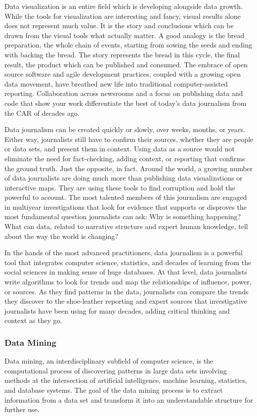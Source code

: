 Data visualization is an entire field which is developing alongside data growth. While the tools for visualization are interesting and fancy, visual results alone does not represent much value. It is the story and conclusions which can be drawn from the visual tools what actually matter. A good analogy is the bread preparation, the whole chain of events, starting from sowing the seeds and ending with backing the bread. The story represents the bread in this cycle, the final result, the product which can be published and consumed. The embrace of open source software and agile development practices, coupled with a growing open data movement, have breathed new life into traditional computer-assisted reporting. Collaboration across newsrooms and a focus on publishing data and code that show your work differentiate the best of today’s data journalism from the CAR of decades ago.

Data journalism can be created quickly or slowly, over weeks, months, or years. Either way, journalists still have to confirm their sources, whether they are people or data sets, and present them in context. Using data as a source would not eliminate the need for fact-checking, adding context, or reporting that confirms the ground truth. Just the opposite, in fact. Around the world, a growing number of data journalists are doing much more than publishing data visualizations or interactive maps. They are using these tools to find corruption and hold the powerful to account. The most talented members of this journalism are engaged in multiyear investigations that look for evidence that supports or disproves the most fundamental question journalists can ask: Why is something happening? What can data, related to narrative structure and expert human knowledge, tell about the way the world is changing?

In the hands of the most advanced practitioners, data journalism is a powerful tool that integrates computer science, statistics, and decades of learning from the social sciences in making sense of huge databases. At that level, data journalists write algorithms to look for trends and map the relationships of influence, power, or sources. As they find patterns in the data, journalists can compare the trends they discover to the shoe-leather reporting and expert sources that investigative journalists have been using for many decades, adding critical thinking and context as they go.


\subsubsection{Data Mining}
Data mining, an interdisciplinary subfield of computer science, is the computational process of discovering patterns in large data sets involving methods at the intersection of artificial intelligence, machine learning, statistics, and database systems. The goal of the data mining process is to extract information from a data set and transform it into an understandable structure for further use.

